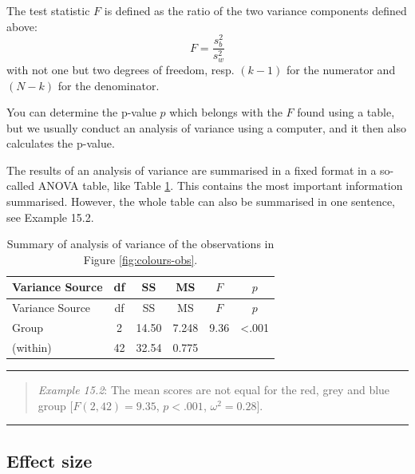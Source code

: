 \documentclass[
]{book}
\begin{document}
The test statistic \(F\) is defined as the ratio of the two
variance components defined above:
\begin{equation}
  \label{eq:Fratio}
    F = \frac{ s^2_b } { s^2_w }
\end{equation}
with not one but two
degrees of freedom, resp. \((k-1)\) for the numerator and \((N-k)\) for the denominator.

You can determine the p-value \(p\) which belongs with the
\(F\) found using a table, but we usually conduct an
analysis of variance using a computer, and it then also calculates the
p-value.

The results of an analysis of variance are summarised in a fixed format
in a so-called ANOVA table, like
Table \ref{tab:colours-anova}. This contains the most important
information summarised. However, the whole table can also be summarised in
one sentence, see Example 15.2.

\begin{longtable}[]{@{}lccccc@{}}
\caption{\label{tab:colours-anova} Summary of analysis of variance of the observations in Figure \ref{fig:colours-obs}.}\tabularnewline
\toprule
Variance Source & df & SS & MS & \(F\) & \(p\) \\
\midrule
\endfirsthead
\toprule
Variance Source & df & SS & MS & \(F\) & \(p\) \\
\midrule
\endhead
Group & 2 & 14.50 & 7.248 & 9.36 & \textless.001 \\
(within) & 42 & 32.54 & 0.775 & & \\
\bottomrule
\end{longtable}

\begin{center}\rule{0.5\linewidth}{0.5pt}\end{center}

\begin{quote}
\emph{Example 15.2}:
The mean scores are not equal for the red, grey and blue group
\([F(2,42) = 9.35\), \(p < .001\), \(\omega^2 = 0.28]\).
\end{quote}

\begin{center}\rule{0.5\linewidth}{0.5pt}\end{center}

\hypertarget{sec:anova-oneway-effectsize}{%
\subsection{Effect size}\label{sec:anova-oneway-effectsize}}
\end{document}
